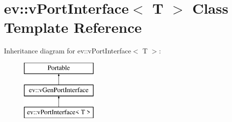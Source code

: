 \hypertarget{classev_1_1vPortInterface}{}\section{ev\+:\+:v\+Port\+Interface$<$ T $>$ Class Template Reference}
\label{classev_1_1vPortInterface}
Inheritance diagram for ev\+:\+:v\+Port\+Interface$<$ T $>$\+:\begin{figure}[H]
\begin{center}
\leavevmode
\includegraphics[height=3.000000cm]{classev_1_1vPortInterface}
\end{center}
\end{figure}
